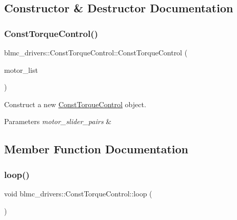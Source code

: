 \subsection{Constructor \& Destructor Documentation}
\mbox{\label{classblmc__drivers_1_1ConstTorqueControl_a2253fc0273462fa35c21f1424dcc919c}} 
\subsubsection{\texorpdfstring{Const\+Torque\+Control()}{ConstTorqueControl()}}
{\footnotesize\ttfamily blmc\+\_\+drivers\+::\+Const\+Torque\+Control\+::\+Const\+Torque\+Control (\begin{DoxyParamCaption}\item[{std\+::vector$<$ \hyperlink{namespaceblmc__drivers_ab975c3be3c53a93a10c491f07a132e2b}{Safe\+Motor\+\_\+ptr} $>$}]{motor\+\_\+list }\end{DoxyParamCaption})\hspace{0.3cm}{\ttfamily [inline]}}



Construct a new \hyperlink{classblmc__drivers_1_1ConstTorqueControl}{Const\+Torque\+Control} object. 


\begin{DoxyParams}{Parameters}
{\em motor\+\_\+slider\+\_\+pairs} & \\
\hline
\end{DoxyParams}


\subsection{Member Function Documentation}
\mbox{\label{classblmc__drivers_1_1ConstTorqueControl_a82a2bc2327fc6fb6a10a4ae88d01e87f}} 
\subsubsection{\texorpdfstring{loop()}{loop()}}
{\footnotesize\ttfamily void blmc\+\_\+drivers\+::\+Const\+Torque\+Control\+::loop (\begin{DoxyParamCaption}{ }\end{DoxyParamCaption})\hspace{0.3cm}{\ttfamily [private]}}



